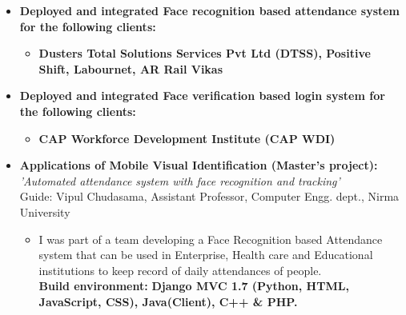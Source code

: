 \documentclass[11pt,letterpaper,sans]{moderncv}        %
\begin{document}
\begin{itemize}

\item{\textbf{Deployed and integrated Face recognition based attendance system for the following clients:}
\vspace{1pt}

\small{
\begin{itemize}
\item \textbf{Dusters Total Solutions Services Pvt Ltd (DTSS), Positive Shift, Labournet, AR Rail Vikas}
\end{itemize}}}

\vspace{5pt}

\item{\textbf{Deployed and integrated Face verification based login system for the following clients:}
\vspace{1pt}

\small{
\begin{itemize}
\item \textbf{CAP Workforce Development Institute (CAP WDI)}
\end{itemize}}}

\vspace{5pt}

\item{\textbf{Applications of Mobile Visual Identification (Master's project):}
\\ \textit{'Automated attendance system with face recognition and tracking'}
\\ Guide: Vipul Chudasama, Assistant Professor, Computer Engg. dept., Nirma University
\vspace{1pt}

\small{
\begin{itemize}
\item I was part of a team developing a Face Recognition based Attendance system that can be used in Enterprise, Health care and Educational institutions to keep record of daily attendances of people.
\\ \textbf{ Build environment:} \textbf{Django MVC 1.7 (Python, HTML, JavaScript, CSS), Java(Client), C++ \& PHP.}
\end{itemize}}}

\vspace{5pt}


\end{itemize}
\end{document}
